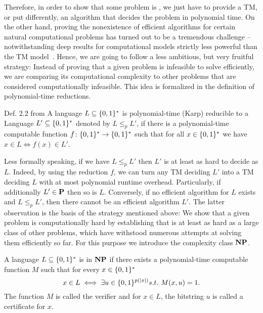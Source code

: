 Therefore, in order to show that some problem is , we just have to provide a TM, or put differently, an algorithm that decides the problem in polynomial time.
On the other hand, proving the nonexistence of efficient algorithms for certain natural computational problems has turned out to be a tremendous challenge -- notwithstanding deep results for computational models strictly less powerful than the TM model~\cite[Part Two]{Arora_2009_Computational}.
Hence, we are going to follow a less ambitious, but very fruitful strategy:
Instead of proving that a given problem is infeasible to solve efficiently, we are comparing its computational complexity to other problems that are considered computationally infeasible.
This idea is formalized in the definition of polynomial-time reductions.

\begin{definition}{Def. 2.2 from \cite{Arora_2009_Computational}}
  \label{def:complexity.reducibility}
  A language $L \subset \BitStrings$ is polynomial-time (Karp) reducible to a Language $L' \subset \BitStrings$ denoted by $L \le_p L'$, if there is a polynomial-time computable function $f\colon \BitStrings \to \BitStrings$ such that for all $x \in \BitStrings$ we have $x \in L \iff f(x) \in L'$.
\end{definition}

Less formally speaking, if we have $L \le_p L'$ then $L'$ is at least as hard to decide as $L$.
Indeed, by using the reduction $f$, we can turn any TM deciding $L'$ into a TM deciding $L$ with at most polynomial runtime overhead.
Particularly, if additionally $L' \in \P$ then so is $L$.
Conversely, if no efficient algorithm for $L$ exists and $L \le_p L'$, then there cannot be an efficient algorithm $L'$.
The latter observation is the basis of the strategy mentioned above:
We show that a given problem is computationally hard by establishing that is at least as hard as a large class of other problems, which have withstood numerous attempts at solving them efficiently so far.
For this purpose we introduce the complexity class $\NP$.

\begin{definition}
  \label{def:complexity.np}
  A language $L \subset \BitStrings$ is in $\NP$ if there exists a polynomial-time computable function $M$ such that for every $x \in \BitStrings$
  \[
    x \in L \iff \exists u \in \{ 0, 1 \}^{p(\abs{x})} s.t.\ M(x, u) = 1.
  \]
  The function $M$ is called the verifier and for $x \in L$, the bitstring $u$ is called a certificate for $x$.
\end{definition}

